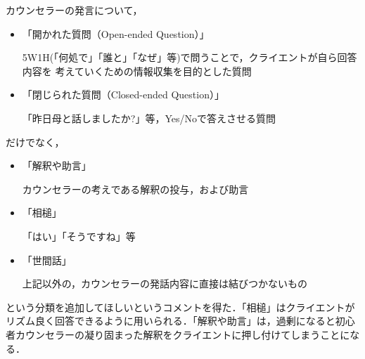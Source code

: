 \documentclass[shuuron]{kuee}
\begin{document}
カウンセラーの発言について，
\begin{itemize}
  \item 「開かれた質問（Open-ended Question）」

  5W1H(「何処で」「誰と」「なぜ」等)で問うことで，クライエントが自ら回答内容を
  考えていくための情報収集を目的とした質問
  \item 「閉じられた質問（Closed-ended Question）」

  「昨日母と話しましたか?」等，Yes/Noで答えさせる質問
\end{itemize}
だけでなく，
\begin{itemize}
  \item 「解釈や助言」

  カウンセラーの考えである解釈の投与，および助言
  \item 「相槌」

  「はい」「そうですね」等
  \item 「世間話」

  上記以外の，カウンセラーの発話内容に直接は結びつかないもの
\end{itemize}
という分類を追加してほしいというコメントを得た．「相槌」はクライエントがリズム良く回答できるように用いられる．「解釈や助言」は，過剰になると初心者カウンセラーの凝り固まった解釈をクライエントに押し付けてしまうことになる．%
\end{document}
